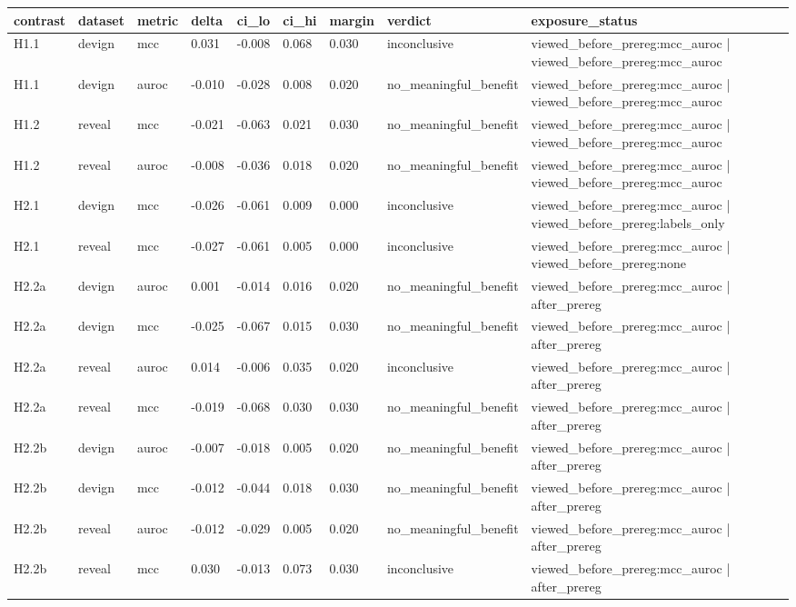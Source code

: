 \begin{tabular}{lllllllll}
\toprule
contrast & dataset & metric & delta & ci\_lo & ci\_hi & margin & verdict & exposure\_status \\
\midrule
H1.1 & devign & mcc & 0.031 & -0.008 & 0.068 & 0.030 & inconclusive & viewed\_before\_prereg:mcc\_auroc | viewed\_before\_prereg:mcc\_auroc \\
H1.1 & devign & auroc & -0.010 & -0.028 & 0.008 & 0.020 & no\_meaningful\_benefit & viewed\_before\_prereg:mcc\_auroc | viewed\_before\_prereg:mcc\_auroc \\
H1.2 & reveal & mcc & -0.021 & -0.063 & 0.021 & 0.030 & no\_meaningful\_benefit & viewed\_before\_prereg:mcc\_auroc | viewed\_before\_prereg:mcc\_auroc \\
H1.2 & reveal & auroc & -0.008 & -0.036 & 0.018 & 0.020 & no\_meaningful\_benefit & viewed\_before\_prereg:mcc\_auroc | viewed\_before\_prereg:mcc\_auroc \\
H2.1 & devign & mcc & -0.026 & -0.061 & 0.009 & 0.000 & inconclusive & viewed\_before\_prereg:mcc\_auroc | viewed\_before\_prereg:labels\_only \\
H2.1 & reveal & mcc & -0.027 & -0.061 & 0.005 & 0.000 & inconclusive & viewed\_before\_prereg:mcc\_auroc | viewed\_before\_prereg:none \\
H2.2a & devign & auroc & 0.001 & -0.014 & 0.016 & 0.020 & no\_meaningful\_benefit & viewed\_before\_prereg:mcc\_auroc | after\_prereg \\
H2.2a & devign & mcc & -0.025 & -0.067 & 0.015 & 0.030 & no\_meaningful\_benefit & viewed\_before\_prereg:mcc\_auroc | after\_prereg \\
H2.2a & reveal & auroc & 0.014 & -0.006 & 0.035 & 0.020 & inconclusive & viewed\_before\_prereg:mcc\_auroc | after\_prereg \\
H2.2a & reveal & mcc & -0.019 & -0.068 & 0.030 & 0.030 & no\_meaningful\_benefit & viewed\_before\_prereg:mcc\_auroc | after\_prereg \\
H2.2b & devign & auroc & -0.007 & -0.018 & 0.005 & 0.020 & no\_meaningful\_benefit & viewed\_before\_prereg:mcc\_auroc | after\_prereg \\
H2.2b & devign & mcc & -0.012 & -0.044 & 0.018 & 0.030 & no\_meaningful\_benefit & viewed\_before\_prereg:mcc\_auroc | after\_prereg \\
H2.2b & reveal & auroc & -0.012 & -0.029 & 0.005 & 0.020 & no\_meaningful\_benefit & viewed\_before\_prereg:mcc\_auroc | after\_prereg \\
H2.2b & reveal & mcc & 0.030 & -0.013 & 0.073 & 0.030 & inconclusive & viewed\_before\_prereg:mcc\_auroc | after\_prereg \\

\end{tabular}
